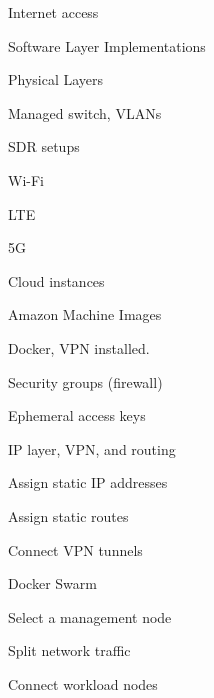\begin{outline}
\begin{outline}
\begin{outline}
\begin{outline}
                \item Internet access
            \end{outline}
            \item Software Layer Implementations
            \begin{outline}
                \item Physical Layers
                \begin{outline}
                    \item Managed switch, VLANs
                    \item SDR setups
                    \begin{outline}
                        \item Wi-Fi
                        \item LTE
                        \item 5G
                    \end{outline}
                \end{outline}
                \item Cloud instances
                \begin{outline}
                    \item Amazon Machine Images
                    \item Docker, VPN installed.
                    \item Security groups (firewall)
                    \item Ephemeral access keys
                \end{outline}
                \item IP layer, VPN, and routing
                \begin{outline}
                    \item Assign static IP addresses
                    \item Assign static routes
                    \item Connect VPN tunnels
                \end{outline}
                \item Docker Swarm
                \begin{outline}
                    \item Select a management node
                    \item Split network traffic
                    \item Connect workload nodes
                \end{outline}

\end{outline}
\end{outline}
\end{outline}
\end{outline}
